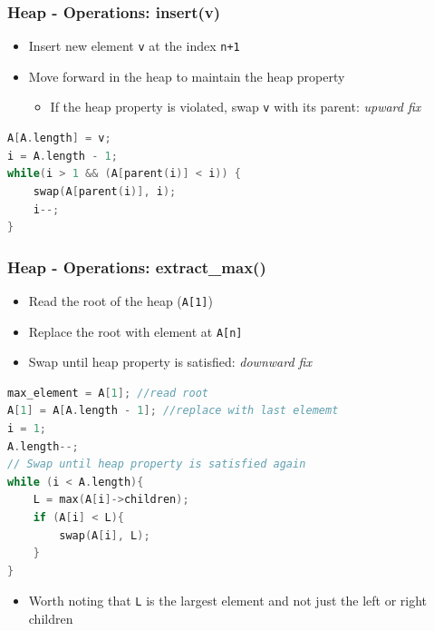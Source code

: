 \documentclass{beamer}
\begin{document}
\begin{frame}[fragile]
\frametitle{Heap - Operations: insert(v)}
	\begin{itemize}
		\item Insert new element \verb|v| at the index \verb|n+1|
		\item Move forward in the heap to maintain the heap property
			\begin{itemize}
				\item If the heap property is violated, swap \verb|v| with its parent: \textit{upward fix}
			\end{itemize}
	\end{itemize}
	\begin{lstlisting}[language=c++]
A[A.length] = v;
i = A.length - 1;
while(i > 1 && (A[parent(i)] < i)) {
	swap(A[parent(i)], i);
	i--;
}
\end{lstlisting}
\end{frame}

\begin{frame}[fragile]
\frametitle{Heap - Operations: extract\_max()}
	\begin{itemize}
		\item Read the root of the heap (\verb|A[1]|)
		\item Replace the root with element at \verb|A[n]|
		\item Swap until heap property is satisfied: \textit{downward fix}
	\end{itemize}
	
	\begin{lstlisting}[language=c++]
max_element = A[1]; //read root
A[1] = A[A.length - 1]; //replace with last elememt
i = 1;
A.length--;
// Swap until heap property is satisfied again
while (i < A.length){
	L = max(A[i]->children);
	if (A[i] < L){
		swap(A[i], L);
	}
}
\end{lstlisting}
	\begin{itemize}
		\item Worth noting that \verb|L| is the largest element and not just the left or right children
	\end{itemize}
\end{frame}
\end{document}
